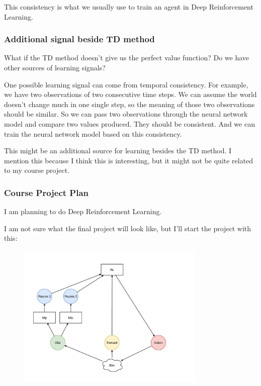 This consistency is what we usually use to train an agent in Deep Reinforcement Learning.

\subsubsection*{Additional signal beside TD method}
What if the TD method doesn't give us the perfect value function? Do we have other sources of learning signals?

One possible learning signal can come from temporal consistency.
For example, we have two observations of two consecutive time steps.
We can assume the world doesn't change much in one single step, so the meaning of those two observations should be similar.
So we can pass two observations through the neural network model and compare two values produced.
They should be consistent.
And we can train the neural network model based on this consistency.

This might be an additional source for learning besides the TD method. 
I mention this because I think this is interesting, but it might not be quite related to my course project.

\subsubsection*{Course Project Plan}

I am planning to do Deep Reinforcement Learning.

I am not sure what the final project will look like, but I'll start the project with this:

\begin{figure}[h]
    \includegraphics[width=0.8\textwidth]{images/step-0.pdf}
\end{figure}

